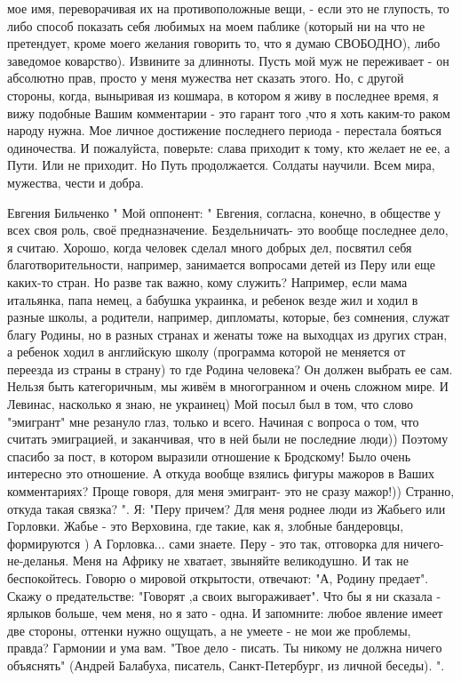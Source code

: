 мое имя, переворачивая их на противоположные вещи, - если это не глупость, то либо способ показать себя любимых на моем паблике (который ни на что не претендует, кроме моего желания говорить то, что я думаю СВОБОДНО), либо заведомое коварство). Извините за длинноты. Пусть мой муж не переживает - он абсолютно прав, просто у меня мужества нет сказать этого. Но, с другой стороны, когда, выныривая из кошмара, в котором я живу в последнее время, я вижу подобные Вашим комментарии - это гарант того ,что я хоть каким-то раком народу нужна. Мое личное достижение последнего периода - перестала бояться одиночества. И пожалуйста, поверьте: слава приходит к тому, кто желает не ее, а Пути. Или не приходит. Но Путь продолжается. Солдаты научили. Всем мира, мужества, чести и добра.

Евгения Бильченко
" Мой оппонент: " Евгения, согласна, конечно, в обществе у всех своя роль, своё предназначение. Бездельничать- это вообще последнее дело, я считаю. Хорошо, когда человек сделал много добрых дел, посвятил себя благотворительности, например, занимается вопросами детей из Перу или еще каких-то стран. Но разве так важно, кому служить? Например, если мама итальянка, папа немец, а бабушка украинка, и ребенок везде жил и ходил в разные школы, а родители, например, дипломаты, которые, без сомнения, служат благу Родины, но в разных странах и женаты тоже на выходцах из других стран, а ребенок ходил в английскую школу (программа которой не меняется от переезда из страны в страну) то где Родина человека? Он должен выбрать ее сам. Нельзя быть категоричным, мы живём в многогранном и очень сложном мире. И Левинас, насколько я знаю, не украинец) Мой посыл был в том, что слово "эмигрант" мне резануло глаз, только и всего. Начиная с вопроса о том, что считать эмиграцией, и заканчивая, что в ней были не последние люди)) Поэтому спасибо за пост, в котором выразили отношение к Бродскому! Было очень интересно это отношение. А откуда вообще взялись фигуры мажоров в Ваших комментариях? Проще говоря, для меня эмигрант- это не сразу мажор!)) Странно, откуда такая связка? ". Я: "Перу причем? Для меня роднее люди из Жабьего или Горловки. Жабье - это Верховина, где такие, как я, злобные бандеровцы, формируются ) А Горловка... сами знаете. Перу - это так, отговорка для ничего-не-деланья. Меня на Африку не хватает, звыняйте великодушно. И так не беспокойтесь. Говорю о мировой открытости, отвечают: "А, Родину предает". Скажу о предательстве: "Говорят ,а своих выгораживает". Что бы я ни сказала - ярлыков больше, чем меня, но я зато - одна. И запомните: любое явление имеет две стороны, оттенки нужно ощущать, а не умеете - не мои же проблемы, правда? Гармонии и ума вам. "Твое дело - писать. Ты никому не должна ничего объяснять" (Андрей Балабуха, писатель, Санкт-Петербург, из личной беседы). ".

